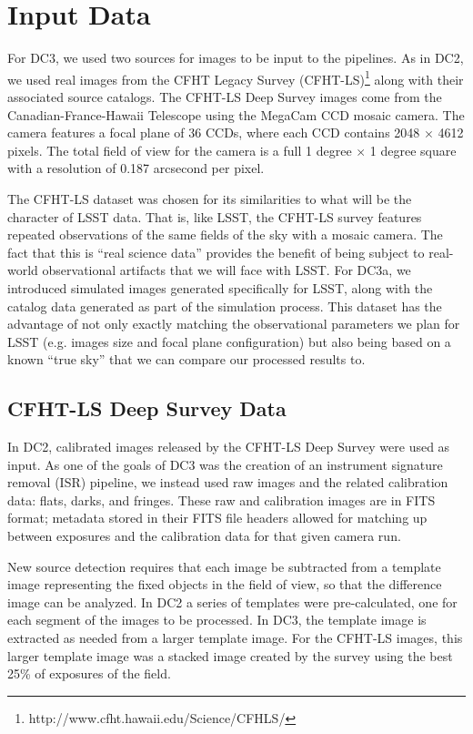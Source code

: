 
\section{Input Data}

For DC3, we used two sources for images to be input to the pipelines.
As in DC2, we used real images from the CFHT Legacy Survey
(CFHT-LS)\footnote{http://www.cfht.hawaii.edu/Science/CFHLS/} along
with their associated source catalogs.  The CFHT-LS Deep Survey images
come from the Canadian-France-Hawaii Telescope using the MegaCam
CCD mosaic camera. The camera features a focal plane of 36 CCDs, where
each CCD contains 2048 $\times$ 4612 pixels. The total field of view
for the camera is a full 1 degree $\times$ 1 degree square with a
resolution of 0.187 arcsecond per pixel.

The CFHT-LS dataset was chosen for its similarities to what will be
the character of LSST data.  That is, like LSST, the CFHT-LS survey
features repeated observations of the same fields of the sky with a
mosaic camera.  The fact that this is ``real science data'' provides
the benefit of being subject to real-world observational artifacts
that we will face with LSST.  For DC3a, we introduced simulated images
generated specifically for LSST, along with the catalog data generated
as part of the simulation process.  This dataset has the advantage of
not only exactly matching the observational parameters we plan for
LSST (e.g. images size and focal plane configuration) but also being
based on a known ``true sky'' that we can compare our processed
results to.

\subsection{CFHT-LS Deep Survey Data}

In DC2, calibrated images released by the CFHT-LS Deep Survey were used as 
input. As one of the goals of DC3 was the creation of an instrument signature 
removal (ISR) pipeline, we instead used raw images and the related 
calibration data: flats, darks, and fringes. These raw and calibration
images are in FITS format; metadata stored in their FITS file 
headers allowed for matching up between exposures and the calibration
data for that given camera run.

New source detection requires that each image be subtracted from a
template image representing the fixed objects in the field of view,
so that the difference image can be analyzed. In DC2 a series of 
templates were pre-calculated, one for each segment of the images to 
be processed. In DC3, the template image is extracted as needed
from a larger template image. For the CFHT-LS images, this larger
template image was a stacked image created by the survey using
the best 25\% of exposures of the field.



